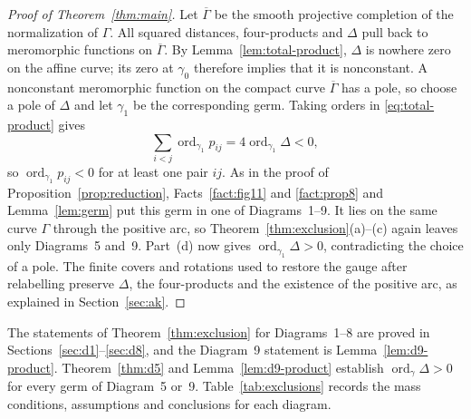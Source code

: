 \documentclass[Threeside,11pt]{article}
\theoremstyle{definition}
\theoremstyle{remark}
\numberwithin{equation}{section}
\theoremstyle{remark}
\newcommand{\ord}{\operatorname{ord}}
\begin{document}
{\begin{proof}[Proof of Theorem~\ref{thm:main}]
Let $\overline\Gamma$ be the smooth projective completion of the normalization of $\Gamma$.
All squared distances, four-products and $\Delta$ pull back to meromorphic functions on
$\overline\Gamma$.  By Lemma~\ref{lem:total-product}, $\Delta$ is nowhere zero on the affine
curve; its zero at $\gamma_0$ therefore implies that it is nonconstant.  A nonconstant
meromorphic function on the compact curve $\overline\Gamma$ has a pole, so choose a pole
of $\Delta$ and let $\gamma_1$ be the corresponding germ.  Taking orders in
\eqref{eq:total-product} gives
\[
 \sum_{i<j}\ord_{\gamma_1}p_{ij}=4\ord_{\gamma_1}\Delta<0,
\]
so $\ord_{\gamma_1}p_{ij}<0$ for at least one pair $ij$.
As in the proof of Proposition~\ref{prop:reduction}, Facts~\ref{fact:fig11} and
\ref{fact:prop8} and Lemma~\ref{lem:germ} put this germ in one of Diagrams~1--9.
It lies on the same curve $\Gamma$ through the positive arc, so
Theorem~\ref{thm:exclusion}(a)--(c) again leaves only Diagrams~5 and~9.  Part~(d) now gives
$\ord_{\gamma_1}\Delta>0$, contradicting the choice of a pole.
The finite covers and rotations used to restore the gauge after relabelling preserve
$\Delta$, the four-products and the existence of the positive arc, as explained in
Section~\ref{sec:ak}.
\end{proof}

The statements of Theorem~\ref{thm:exclusion} for Diagrams~1--8 are proved in
Sections~\ref{sec:d1}--\ref{sec:d8}, and the Diagram~9 statement is Lemma~\ref{lem:d9-product}.
Theorem~\ref{thm:d5} and Lemma~\ref{lem:d9-product} establish
$\ord_\gamma\Delta>0$ for every germ of Diagram~5 or~9.
Table~\ref{tab:exclusions} records the mass conditions, assumptions and conclusions for each
diagram.

\begin{table}[ht]


\end{table}}
\end{document}
